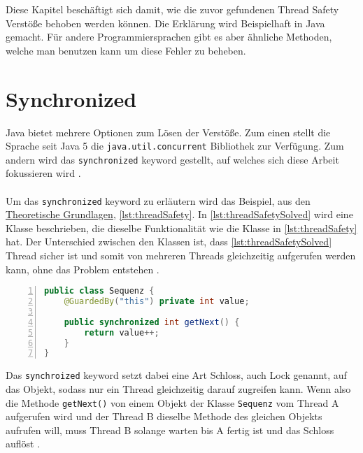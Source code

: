 \label{sec:loesen}

Diese Kapitel beschäftigt sich damit, wie die zuvor gefundenen Thread Safety Verstöße behoben werden können. Die Erklärung wird Beispielhaft in Java gemacht. Für andere Programmiersprachen gibt es aber ähnliche Methoden, welche man benutzen kann um diese Fehler zu beheben.

\section{Synchronized}

Java bietet mehrere Optionen zum Lösen der Verstöße. Zum einen stellt die Sprache seit Java 5 die \texttt{java.util.concurrent} Bibliothek zur Verfügung. Zum andern wird das \texttt{synchronized} keyword gestellt, auf welches sich diese Arbeit fokussieren wird \cite[vgl.][121]{fekete_teaching_nodate}. \\
\\
 Um das \texttt{synchronized} keyword zu erläutern wird das Beispiel, aus den \hyperref[sec:threads]{Theoretische Grundlagen}, \ref{lst:threadSafety}. In \ref{lst:threadSafetySolved} wird eine Klasse beschrieben, die dieselbe Funktionalität wie die Klasse in \ref{lst:threadSafety} hat. Der Unterschied zwischen den Klassen ist, dass \ref{lst:threadSafetySolved} Thread sicher ist und somit von mehreren Threads gleichzeitig aufgerufen werden kann, ohne das Problem entstehen \cite[vgl.][5-6]{brian}. 
\\
 \begin{lstlisting}[language=Java,frame=tb,caption={Thread-safe Sequence Generator \cite{brian}}, label={lst:threadSafetySolved}, numbers=left, stepnumber=1, captionpos=b, tabsize=4]
public class Sequenz {
	@GuardedBy("this") private int value;

	public synchronized int getNext() {
		return value++;
	}
}
\end{lstlisting}

\noindent
Das \texttt{synchroized} keyword setzt dabei eine Art Schloss, auch Lock genannt, auf das Objekt, sodass nur ein Thread gleichzeitig darauf zugreifen kann. Wenn also die Methode \texttt{getNext()} von einem Objekt der Klasse \texttt{Sequenz} vom Thread A aufgerufen wird und der Thread B dieselbe Methode des gleichen Objekts aufrufen will, muss Thread B solange warten bis A fertig ist und das Schloss auflöst \cite[vgl.][17]{brian}.



